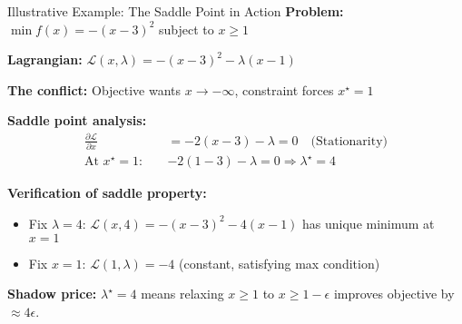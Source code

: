 \documentclass[aspectratio=1610]{beamer}
\begin{document}
\begin{frame}{Illustrative Example: The Saddle Point in Action}
  \textbf{Problem:} $\min f(x) = -(x-3)^2$ subject to $x \geq 1$
  
  \textbf{Lagrangian:} $\mathcal{L}(x,\lambda) = -(x-3)^2 - \lambda(x-1)$
  
  \vspace{0.3cm}
  \textbf{The conflict:} Objective wants $x \to -\infty$, constraint forces $x^{\star} = 1$
  
  \vspace{0.3cm}
  \textbf{Saddle point analysis:}
  \begin{align}
    \frac{\partial \mathcal{L}}{\partial x} &= -2(x-3) - \lambda = 0 \quad \text{(Stationarity)}\\
    \text{At } x^{\star} = 1: \quad &-2(1-3) - \lambda = 0 \Rightarrow \lambda^{\star} = 4
  \end{align}
  
  \vspace{0.3cm}
  \textbf{Verification of saddle property:}
  \begin{itemize}
    \item Fix $\lambda = 4$: $\mathcal{L}(x,4) = -(x-3)^2 - 4(x-1)$ has unique minimum at $x = 1$
    \item Fix $x = 1$: $\mathcal{L}(1,\lambda) = -4$ (constant, satisfying max condition)
  \end{itemize}
  
  \textbf{Shadow price:} $\lambda^{\star} = 4$ means relaxing $x \geq 1$ to $x \geq 1-\epsilon$ improves objective by $\approx 4\epsilon$.
\end{frame}
\end{document}
